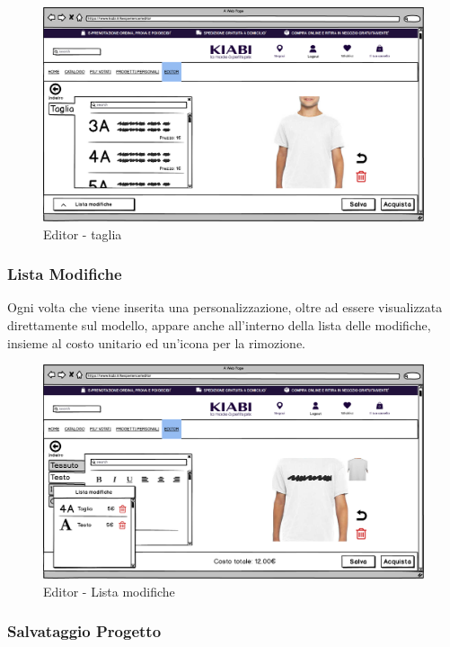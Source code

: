 \documentclass[12pt,italian,]{report}
\begin{document}
\begin{figure}[h]
\centering
\includegraphics{../../balsamiq/balsamiq_finale/Editor-caratteristicacapotaglia.png}
\caption{Editor - taglia}
\label{editor_taglia}
\end{figure}

\newpage
\subsubsection{Lista Modifiche} 

Ogni volta che viene inserita una personalizzazione, oltre ad essere visualizzata direttamente sul modello, appare anche all'interno della lista delle modifiche, insieme al costo unitario ed un'icona per la rimozione.

\begin{figure}[h]
\centering
\includegraphics{../../balsamiq/balsamiq_finale/Editor-caratteristicabustotesto4.png}
\caption{Editor - Lista modifiche}
\label{editor_listamod}
\end{figure}


\newpage
\subsubsection{Salvataggio Progetto} 
\end{document}
